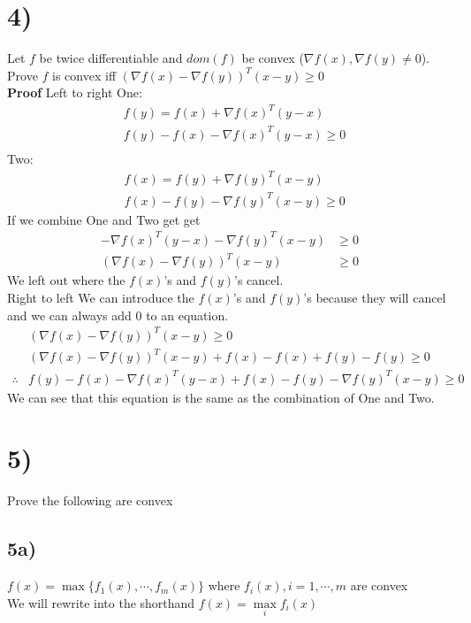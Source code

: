 \documentclass[12pt,letter]{article}
\begin{document}
\section*{4)}
Let $f$ be twice differentiable and $dom(f)$ be convex ($\nabla f(x), \nabla f(y) \neq 0$). \\
Prove $f$ is convex iff $(\nabla f(x) - \nabla f(y))^T(x-y)\geq0$
\\
\textbf{Proof} 
Left to right
One:
\begin{align*}
    &f(y) = f(x) + \nabla f(x)^T(y-x) \\
    &f(y) - f(x) - \nabla f(x)^T(y-x) \geq 0\\
\end{align*}
Two:
\begin{align*}
    &f(x) = f(y) + \nabla f(y)^T(x-y) \\
    &f(x) - f(y) - \nabla f(y)^T(x-y) \geq 0
\end{align*}
If we combine One and Two get get
\begin{align*}
    -\nabla f(x)^T(y-x) - \nabla f(y)^T(x-y) &\geq 0 \\
    (\nabla f(x) - \nabla f(y))^T(x-y) &\geq 0
\end{align*}
We left out where the $f(x)$'s and $f(y)$'s cancel.
\\
Right to left
We can introduce the $f(x)$'s and $f(y)$'s because they will cancel and we can
always add 0 to an equation.
\begin{align*}
    &(\nabla f(x) - \nabla f(y))^T(x-y) \geq 0 \\
    &(\nabla f(x) - \nabla f(y))^T(x-y) +f(x) - f(x) +f(y) - f(y) \geq 0 \\
    \therefore &f(y) - f(x) - \nabla f(x)^T(y-x) +f(x) - f(y) - \nabla f(y)^T(x-y) \geq 0
\end{align*}
We can see that this equation is the same as the combination of One and Two.

\section*{5)}
Prove the following are convex
\subsection*{5a)}
$f(x) = \max\{f_1(x),\cdots,f_m(x)\}$ where $f_i(x), i=1,\cdots,m$ are convex\\
We will rewrite into the shorthand $f(x) = \max\limits_i f_i(x)$
\end{document}
